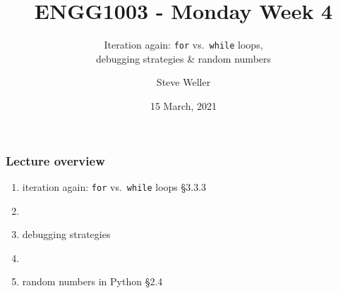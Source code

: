 \documentclass[14pt]{beamer}
\title{ENGG1003 - Monday Week 4}
\subtitle{Iteration again: \texttt{for} vs.~\texttt{while} loops, \\ debugging strategies \& random numbers}
\author{Steve Weller}
\institute{University of Newcastle}
\date{15 March, 2021}
\newcommand\red[1]{{\color{red} #1}}
\begin{document}
\framebreak


\begin{frame}[fragile]

\frametitle{Lecture overview}
\begin{enumerate}
	\item iteration again: \texttt{for} vs.~\texttt{while} loops \red{\S3.3.3}

	\item[]
	
	\item debugging strategies
	
	\item[]
	
	\item random numbers in Python \red{\S2.4}

\end{enumerate}

\end{frame}

\end{document}
